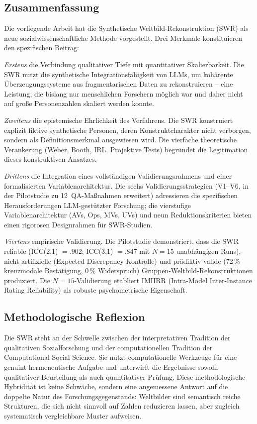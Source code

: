 \documentclass[11pt,a4paper]{article}
\theoremstyle{definition}
\theoremstyle{plain}
\theoremstyle{remark}
\begin{document}
\subsection{Zusammenfassung}

Die vorliegende Arbeit hat die Synthetische Weltbild-Rekonstruktion (SWR) als neue sozialwissenschaftliche Methode vorgestellt. Drei Merkmale konstituieren den spezifischen Beitrag:

\emph{Erstens} die Verbindung qualitativer Tiefe mit quantitativer Skalierbarkeit. Die SWR nutzt die synthetische Integrationsf\"ahigkeit von LLMs, um koh\"arente \"Uberzeugungssysteme aus fragmentarischen Daten zu rekonstruieren -- eine Leistung, die bislang nur menschlichen Forschern m\"oglich war und daher nicht auf gro\ss{}e Personenzahlen skaliert werden konnte.

\emph{Zweitens} die epistemische Ehrlichkeit des Verfahrens. Die SWR konstruiert explizit fiktive synthetische Personen, deren Konstruktcharakter nicht verborgen, sondern als Definitionsmerkmal ausgewiesen wird. Die vierfache theoretische Verankerung (Weber, Booth, IRL, Projektive Tests) begr\"undet die Legitimation dieses konstruktiven Ansatzes.

\emph{Drittens} die Integration eines vollst\"andigen Validierungsrahmens und einer formalisierten Variablenarchitektur. Die sechs Validierungsstrategien (V1--V6, in der Pilotstudie zu 12~QA-Ma\ss{}nahmen erweitert) adressieren die spezifischen Herausforderungen LLM-gest\"utzter Forschung; die vierstufige Variablenarchitektur (AVs, Ops, MVs, UVs) und neun Reduktionskriterien bieten einen rigorosen Designrahmen f\"ur SWR-Studien.

\emph{Viertens} empirische Validierung. Die Pilotstudie demonstriert, dass die SWR reliable (ICC(2,1) $= .902$; ICC(3,1) $= .847$ mit $N = 15$ unabh\"angigen Runs), nicht-artifizielle (Expected-Discrepancy-Kontrolle) und pr\"adiktiv valide (72\,\% kreuzmodale Best\"atigung, 0\,\% Widerspruch) Gruppen-Weltbild-Rekonstruktionen produziert. Die $N = 15$-Validierung etabliert IMIIRR (Intra-Model Inter-Instance Rating Reliability) als robuste psychometrische Eigenschaft.

\subsection{Methodologische Reflexion}

Die SWR steht an der Schwelle zwischen der interpretativen Tradition der qualitativen Sozialforschung und der computationellen Tradition der Computational Social Science. Sie nutzt computationelle Werkzeuge f\"ur eine genuint hermeneutische Aufgabe und unterwirft die Ergebnisse sowohl qualitativer Beurteilung als auch quantitativer Pr\"ufung. Diese methodologische Hybridit\"at ist keine Schw\"ache, sondern eine angemessene Antwort auf die doppelte Natur des Forschungsgegenstands: Weltbilder sind semantisch reiche Strukturen, die sich nicht sinnvoll auf Zahlen reduzieren lassen, aber zugleich systematisch vergleichbare Muster aufweisen.
\end{document}
